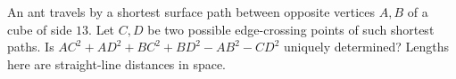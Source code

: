 An ant travels by a shortest surface path between opposite vertices $A,B$ of a cube of side $13$. Let $C,D$ be two possible edge-crossing points of such shortest paths. Is $AC^2+AD^2+BC^2+BD^2-AB^2-CD^2$ uniquely determined? Lengths here are straight-line distances in space.
